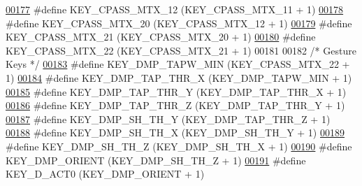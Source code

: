 \begin{DoxyCode}
\hypertarget{dmp_key_8h_source.tex_l00177}{}\hyperlink{dmp_key_8h_ab523943c496c23d274804b08edf0c2a0}{00177} \textcolor{preprocessor}{#define KEY\_CPASS\_MTX\_12            (KEY\_CPASS\_MTX\_11 + 1)}
\hypertarget{dmp_key_8h_source.tex_l00178}{}\hyperlink{dmp_key_8h_add9d93f2020678b2c0a1037f97fc31c9}{00178} \textcolor{preprocessor}{#define KEY\_CPASS\_MTX\_20            (KEY\_CPASS\_MTX\_12 + 1)}
\hypertarget{dmp_key_8h_source.tex_l00179}{}\hyperlink{dmp_key_8h_a9f75392213c1292ef83d3e5223500e57}{00179} \textcolor{preprocessor}{#define KEY\_CPASS\_MTX\_21            (KEY\_CPASS\_MTX\_20 + 1)}
\hypertarget{dmp_key_8h_source.tex_l00180}{}\hyperlink{dmp_key_8h_a106019b24d04189a83cbe262d0b4f881}{00180} \textcolor{preprocessor}{#define KEY\_CPASS\_MTX\_22            (KEY\_CPASS\_MTX\_21 + 1)}
00181 
00182 \textcolor{comment}{/* Gesture Keys */}
\hypertarget{dmp_key_8h_source.tex_l00183}{}\hyperlink{dmp_key_8h_afe62349990c597a5f753eef233885e9d}{00183} \textcolor{preprocessor}{#define KEY\_DMP\_TAPW\_MIN            (KEY\_CPASS\_MTX\_22 + 1)}
\hypertarget{dmp_key_8h_source.tex_l00184}{}\hyperlink{dmp_key_8h_a2fe4310934a466f948cc0a52fabf8a10}{00184} \textcolor{preprocessor}{#define KEY\_DMP\_TAP\_THR\_X           (KEY\_DMP\_TAPW\_MIN + 1)}
\hypertarget{dmp_key_8h_source.tex_l00185}{}\hyperlink{dmp_key_8h_a0c33b33024b7b91167510ee7dff3231a}{00185} \textcolor{preprocessor}{#define KEY\_DMP\_TAP\_THR\_Y           (KEY\_DMP\_TAP\_THR\_X + 1)}
\hypertarget{dmp_key_8h_source.tex_l00186}{}\hyperlink{dmp_key_8h_a79f2fd731f5be0e4ed4572f2d64de318}{00186} \textcolor{preprocessor}{#define KEY\_DMP\_TAP\_THR\_Z           (KEY\_DMP\_TAP\_THR\_Y + 1)}
\hypertarget{dmp_key_8h_source.tex_l00187}{}\hyperlink{dmp_key_8h_a4a1d4465e08051e77aec004995ff8ed2}{00187} \textcolor{preprocessor}{#define KEY\_DMP\_SH\_TH\_Y             (KEY\_DMP\_TAP\_THR\_Z + 1)}
\hypertarget{dmp_key_8h_source.tex_l00188}{}\hyperlink{dmp_key_8h_a53e640147baaac161809f81c7a13293a}{00188} \textcolor{preprocessor}{#define KEY\_DMP\_SH\_TH\_X             (KEY\_DMP\_SH\_TH\_Y + 1)}
\hypertarget{dmp_key_8h_source.tex_l00189}{}\hyperlink{dmp_key_8h_a6d3d587a63dd8db885121376f3d9de93}{00189} \textcolor{preprocessor}{#define KEY\_DMP\_SH\_TH\_Z             (KEY\_DMP\_SH\_TH\_X + 1)}
\hypertarget{dmp_key_8h_source.tex_l00190}{}\hyperlink{dmp_key_8h_ac41087ebcc3dc0d4cd083a1ee71e01d8}{00190} \textcolor{preprocessor}{#define KEY\_DMP\_ORIENT              (KEY\_DMP\_SH\_TH\_Z + 1)}
\hypertarget{dmp_key_8h_source.tex_l00191}{}\hyperlink{dmp_key_8h_ab66e05ae1513ae27ec6275cc275e6b66}{00191} \textcolor{preprocessor}{#define KEY\_D\_ACT0                  (KEY\_DMP\_ORIENT + 1)}

\end{DoxyCode}
